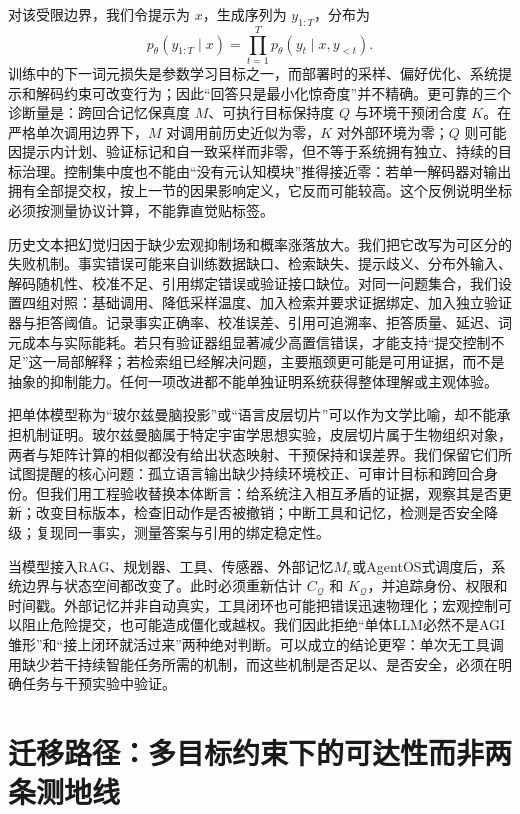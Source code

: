 对该受限边界，我们令提示为 $x$，生成序列为 $y_{1:T}$，分布为
\[
p_\theta(y_{1:T}\mid x)=\prod_{t=1}^{T}p_\theta(y_t\mid x,y_{<t}).
\]
训练中的下一词元损失是参数学习目标之一，而部署时的采样、偏好优化、系统提示和解码约束可改变行为；因此“回答只是最小化惊奇度”并不精确。更可靠的三个诊断量是：跨回合记忆保真度 $M$、可执行目标保持度 $Q$ 与环境干预闭合度 $K$。在严格单次调用边界下，$M$ 对调用前历史近似为零，$K$ 对外部环境为零；$Q$ 则可能因提示内计划、验证标记和自一致采样而非零，但不等于系统拥有独立、持续的目标治理。控制集中度也不能由“没有元认知模块”推得接近零：若单一解码器对输出拥有全部提交权，按上一节的因果影响定义，它反而可能较高。这个反例说明坐标必须按测量协议计算，不能靠直觉贴标签。

历史文本把幻觉归因于缺少宏观抑制场和概率涨落放大。我们把它改写为可区分的失败机制。事实错误可能来自训练数据缺口、检索缺失、提示歧义、分布外输入、解码随机性、校准不足、引用绑定错误或验证接口缺位。对同一问题集合，我们设置四组对照：基础调用、降低采样温度、加入检索并要求证据绑定、加入独立验证器与拒答阈值。记录事实正确率、校准误差、引用可追溯率、拒答质量、延迟、词元成本与实际能耗。若只有验证器组显著减少高置信错误，才能支持“提交控制不足”这一局部解释；若检索组已经解决问题，主要瓶颈更可能是可用证据，而不是抽象的抑制能力。任何一项改进都不能单独证明系统获得整体理解或主观体验。

把单体模型称为“玻尔兹曼脑投影”或“语言皮层切片”可以作为文学比喻，却不能承担机制证明。玻尔兹曼脑属于特定宇宙学思想实验，皮层切片属于生物组织对象，两者与矩阵计算的相似都没有给出状态映射、干预保持和误差界。我们保留它们所试图提醒的核心问题：孤立语言输出缺少持续环境校正、可审计目标和跨回合身份。但我们用工程验收替换本体断言：给系统注入相互矛盾的证据，观察其是否更新；改变目标版本，检查旧动作是否被撤销；中断工具和记忆，检测是否安全降级；复现同一事实，测量答案与引用的绑定稳定性。

当模型接入RAG、规划器、工具、传感器、外部记忆$M_e$或AgentOS式调度后，系统边界与状态空间都改变了。此时必须重新估计 $C_{\mathcal Q}$ 和 $K_{\mathcal Q}$，并追踪身份、权限和时间戳。外部记忆并非自动真实，工具闭环也可能把错误迅速物理化；宏观控制可以阻止危险提交，也可能造成僵化或越权。我们因此拒绝“单体LLM必然不是AGI雏形”和“接上闭环就活过来”两种绝对判断。可以成立的结论更窄：单次无工具调用缺少若干持续智能任务所需的机制，而这些机制是否足以、是否安全，必须在明确任务与干预实验中验证。

\section{迁移路径：多目标约束下的可达性而非两条测地线}
\label{sec:section_1036}

